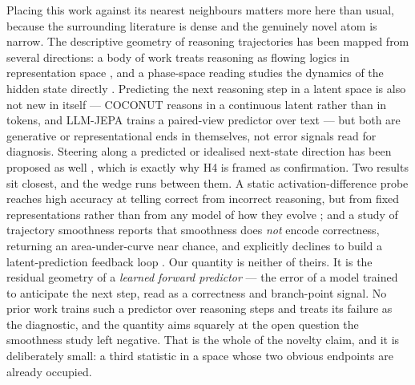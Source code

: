 Placing this work against its nearest neighbours matters more here than usual,
because the surrounding literature is dense and the genuinely novel atom is
narrow. The descriptive geometry of reasoning trajectories has been mapped from
several directions: a body of work treats reasoning as flowing logics in
representation space \citep{zhou2025flowing}, and a phase-space reading studies the
dynamics of the hidden state directly \citep{phasespace2024}. Predicting the next
reasoning step in a latent space is also not new in itself --- COCONUT
\citep{hao2024coconut} reasons in a continuous latent rather than in tokens, and
LLM-JEPA \citep{llmjepa2025} trains a paired-view predictor over text --- but both
are generative or representational ends in themselves, not error signals read for
diagnosis. Steering along a predicted or idealised next-state direction has been
proposed as well \citep{asm2026}, which is exactly why H4 is framed as
confirmation. Two results sit closest, and the wedge runs between them. A static
activation-difference probe reaches high accuracy at telling correct from
incorrect reasoning, but from fixed representations rather than from any model of
how they evolve \citep{sun2026trajectories}; and a study of trajectory smoothness
reports that smoothness does \emph{not} encode correctness, returning an
area-under-curve near chance, and explicitly declines to build a
latent-prediction feedback loop \citep{ssp2026smoothness}. Our quantity is neither
of theirs. It is the residual geometry of a \emph{learned forward predictor} ---
the error of a model trained to anticipate the next step, read as a correctness
and branch-point signal. No prior work trains such a predictor over reasoning
steps and treats its failure as the diagnostic, and the quantity aims squarely at
the open question the smoothness study left negative. That is the whole of the
novelty claim, and it is deliberately small: a third statistic in a space whose
two obvious endpoints are already occupied.

